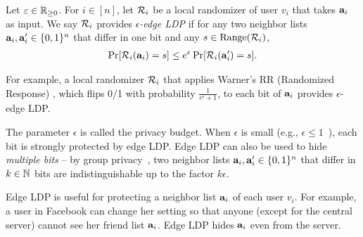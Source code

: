 \begin{definition}  \label{def:edge_LDP} 
Let $\varepsilon \in \mathbb{R}_{\ge0}$. 
  For 
  $i \in [n]$, 
  let $\mathcal{R}_i$ be a 
  local randomizer 
  of user $v_i$ that 
  takes $\mathbf{a}_i$ as input. We say $\mathcal{R}_i$ provides
  \emph{$\epsilon$-edge LDP} 
  if for any two neighbor lists 
  $\mathbf{a}_i, \mathbf{a}'_i \in \{0,1\}^n$ 
  that differ in one bit and any 
  $s \in \mathrm{Range}(\mathcal{R}_i)$, 
\begin{align}
\Pr[\mathcal{R}_i(\mathbf{a}_i) = s] \leq e^\varepsilon \Pr[\mathcal{R}_i(\mathbf{a}'_i) = s].
\label{eq:edge_LDP}
\end{align}
\end{definition}
For example, a local randomizer $\mathcal{R}_i$ that applies Warner's RR (Randomized Response) \cite{Warner_JASA65}, which flips 0/1 with probability $\frac{1}{e^\epsilon + 1}$, to each bit of $\mathbf{a}_i$ 
provides $\epsilon$-edge LDP. 

The parameter $\epsilon$ is called the privacy budget. 
When 
$\epsilon$ is small (e.g., $\epsilon \leq 1$~\cite{DP_Li}), each bit is strongly protected by edge LDP. 
Edge LDP can also be used to hide \textit{multiple bits} -- 
by group privacy~\cite{DP}, two neighbor lists $\mathbf{a}_i, \mathbf{a}'_i \in \{0,1\}^n$ that differ in $k \in \mathbb{N}$ bits are indistinguishable up to the factor $k\epsilon$. 

Edge LDP is useful for protecting a neighbor list $\mathbf{a}_i$ of each user $v_i$. 
For example, 
a user in Facebook can change her setting so that anyone (except for the central server) cannot see her friend list $\mathbf{a}_i$. 
Edge LDP hides $\mathbf{a}_i$ even from the server. 

